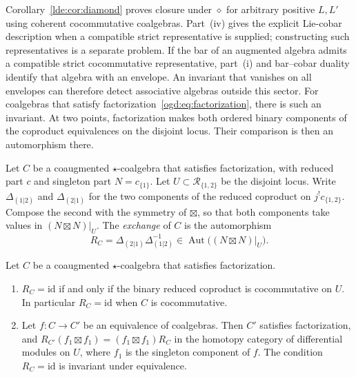 Corollary~\ref{lde:cor:diamond} proves closure under \(\diamond\) for arbitrary positive \(L,L'\) using coherent cocommutative coalgebras.
Part~\textup{(iv)} gives the explicit Lie-cobar description when a compatible strict representative is supplied; constructing such representatives is a separate problem.
If the bar of an augmented algebra admits a compatible strict cocommutative representative, part~\textup{(i)} and bar--cobar duality identify that algebra with an envelope.
An invariant that vanishes on all envelopes can therefore detect associative algebras outside this sector.
For coalgebras that satisfy factorization~\eqref{ogd:eq:factorization}, there is such an invariant.
At two points, factorization makes both ordered binary components of the coproduct equivalences on the disjoint locus.
Their comparison is then an automorphism there.

Let\label{ogd:def:factorizing-exchange-input} \(C\) be a coaugmented \(\star\)-coalgebra that satisfies factorization, with reduced part \(c\) and singleton part \(N=c_{\{1\}}\).
Let \(U\subset\mathscr R_{\{1,2\}}\) be the disjoint locus.
Write\label{ogd:def:ordered-binary-coproduct-components} \(\Delta_{(1|2)}\) and \(\Delta_{(2|1)}\) for the two components of the reduced coproduct on \(j^!c_{\{1,2\}}\).
Compose the second with the symmetry of \(\boxtimes\), so that both components take values in \((N\boxtimes N)|_U\).
The \emph{exchange} of \(C\) is the automorphism
\begin{equation}\label{ogd:eq:exchange}
 R_C=\Delta_{(2|1)}\Delta_{(1|2)}^{-1}\in\operatorname{Aut}\bigl((N\boxtimes N)|_U\bigr).
\end{equation}
\begin{proposition}\label{ogd:prop:exchange}
Let \(C\) be a coaugmented \(\star\)-coalgebra that satisfies factorization.
\begin{enumerate}
\item \(R_C=\mathrm{id}\) if and only if the binary reduced coproduct is cocommutative on \(U\).
In particular \(R_C=\mathrm{id}\) when \(C\) is cocommutative.
\item Let \(f:C\to C'\) be an equivalence of coalgebras.
Then \(C'\) satisfies factorization, and \(R_{C'}(f_1\boxtimes f_1)=(f_1\boxtimes f_1)R_C\) in the homotopy category of differential modules on \(U\), where \(f_1\) is the singleton component of \(f\).
The condition \(R_C=\mathrm{id}\) is invariant under equivalence.
\end{enumerate}
\end{proposition}

